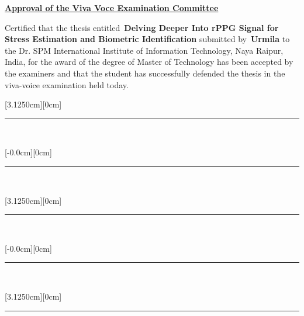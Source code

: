\thispagestyle{empty}
\begin{center}
\bf{\underline{Approval of the Viva Voce Examination Committee}}
\end{center}
\vspace*{0.5cm}
\begin{flushright}
\end{flushright}
Certified that the thesis entitled~\textbf{Delving Deeper Into rPPG Signal for Stress Estimation and Biometric Identification} submitted by~\textbf{Urmila} to the Dr. SPM International Institute of Information Technology, Naya Raipur, India, for the award of the degree of Master of Technology has been accepted by the examiners and that the student has successfully defended the thesis in the viva-voice examination held today.
\vspace*{1.0cm}


\begin{flushleft}
\raisebox{0.1cm}[3.1250cm][0cm]{
\begin{minipage}{6.350cm}
\rule{\textwidth}{0.5pt}\\
\end{minipage}
}
\end{flushleft}





\begin{flushright}
\raisebox{-0.50cm}[-0.0cm][0cm]{
\begin{minipage}{6.350cm}
\rule{\textwidth}{0.5pt}\\
\end{minipage}
}
\end{flushright}


\begin{flushleft}
\raisebox{0.1cm}[3.1250cm][0cm]{
\begin{minipage}{6.350cm}
\rule{\textwidth}{0.5pt}\\
\end{minipage}
}
\end{flushleft}

\begin{flushright}
\raisebox{-0.50cm}[-0.0cm][0cm]{
\begin{minipage}{6.350cm}
\rule{\textwidth}{0.5pt}\\
\end{minipage}
}
\end{flushright}


\begin{flushleft}
\raisebox{0.1cm}[3.1250cm][0cm]{
\begin{minipage}{6.350cm}
\rule{\textwidth}{0.5pt}\\
\end{minipage}
}
\end{flushleft}






